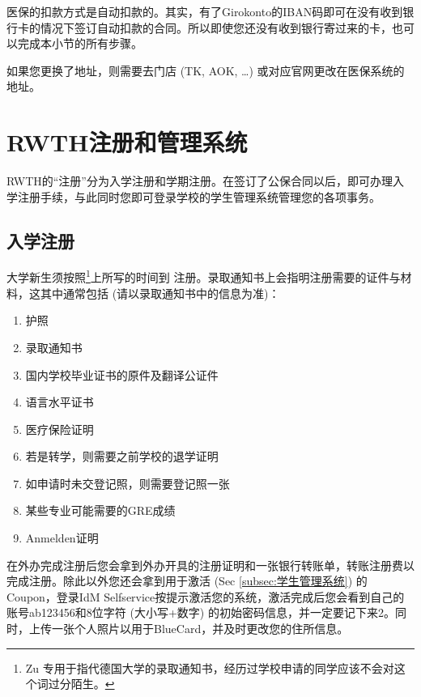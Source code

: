     医保的扣款方式是自动扣款的。其实，有了Girokonto的IBAN码即可在没有收到银行卡的情况下签订自动扣款的合同。所以即使您还没有收到银行寄过来的卡，也可以完成本小节的所有步骤。

    如果您更换了地址，则需要去门店 (TK, AOK, …) 或对应官网更改在医保系统的地址。

\section{RWTH注册和管理系统}\label{sec:RWTH注册和管理系统}

  RWTH的``注册''分为入学注册和学期注册。在签订了公保合同以后，即可办理入学注册手续，与此同时您即可登录学校的学生管理系统管理您的各项事务。

  \subsection{入学注册}\label{subsec:入学注册}

    大学新生须按照\footnote{Zu 专用于指代德国大学的录取通知书，经历过学校申请的同学应该不会对这个词过分陌生。}上所写的时间到\href{https://www.rwth-aachen.de/go/id/pvd/lidx/1}{} 注册。录取通知书上会指明注册需要的证件与材料，这其中通常包括 (请以录取通知书中的信息为准)：
    \begin{enumerate}
      \item 护照
      \item 录取通知书
      \item 国内学校毕业证书的原件及翻译公证件
      \item 语言水平证书
      \item 医疗保险证明
      \item 若是转学，则需要之前学校的退学证明
      \item 如申请时未交登记照，则需要登记照一张
      \item 某些专业可能需要的GRE成绩
      \item Anmelden证明
    \end{enumerate}
    
    在外办完成注册后您会拿到外办开具的注册证明和一张银行转账单，转账注册费以完成注册。除此以外您还会拿到用于激活 (Sec \ref{subsec:学生管理系统}) 的Coupon，登录IdM Selfservice按提示激活您的系统，激活完成后您会看到自己的账号ab123456和8位字符 (大小写+数字) 的初始密码信息，并一定要记下来2。同时，上传一张个人照片以用于BlueCard，并及时更改您的住所信息。


